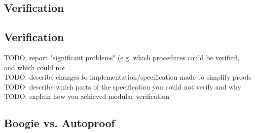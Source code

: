 \subsection{Verification}

\subsection{Verification}
TODO: report "significant problems" (e.g. which procedures could be verified, and which could not\\
TODO: describe changes to implementation/specification made to simplify proofs\\
TODO: describe which parts of the specification you could not verify and why\\
TODO: explain how you achieved modular verification

\subsection{Boogie vs. Autoproof}
